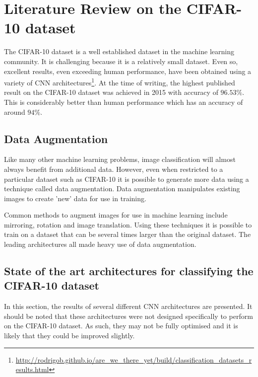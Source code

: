 \section{Literature Review on the CIFAR-10 dataset}\label{sec:litReviewCifar}
	\pagestyle{tom}

The CIFAR-10 dataset\cite{krizhevsky2009learning} is a well established dataset in the machine learning community. It is challenging because it is a relatively small dataset. Even so, excellent results, even exceeding human performance, have been obtained using a variety of CNN architectures\footnote{\url{http://rodrigob.github.io/are_we_there_yet/build/classification_datasets_results.html}}. At the time of writing, the highest published result on the CIFAR-10 dataset was achieved in 2015 with accuracy of $96.53\%$. This is considerably better than human performance which has an accuracy of around $94\%$\cite{karpathy2011lessons}.

\subsection{Data Augmentation}
Like many other machine learning problems, image classification will almost always benefit from additional data\cite{halevy2009unreasonable}. However, even when restricted to a particular dataset such as CIFAR-10 it is possible to generate more data using a technique called data augmentation\cite{cui2015data}. Data augmentation manipulates existing images to create 'new' data for use in training.

Common methods to augment images for use in machine learning include mirroring, rotation and image translation\cite{krizhevsky}. Using these techniques it is possible to train on a dataset that can be several times larger than the original dataset. The leading architectures all made heavy use of data augmentation\cite{graham2014fractional}\cite{mishkin2015all}\cite{springenberg2014striving}.

\subsection{State of the art architectures for classifying the CIFAR-10 dataset}

In this section, the results of several different CNN architectures are presented. It should be noted that these architectures were not designed specifically to perform on the CIFAR-10 dataset. As such, they may not be fully optimised and it is likely that they could be improved slightly.
